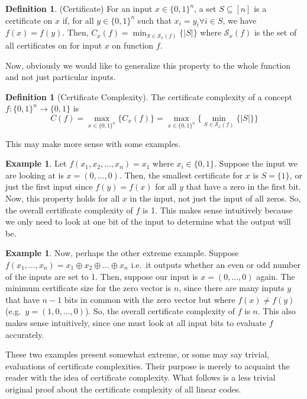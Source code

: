 \documentclass[12pt,twoside]{reedthesis}
\theoremstyle{definition}
\newtheorem{definition}[theorem]{Definition}
\newtheorem{example}[theorem]{Example}
\begin{document}
\begin{definition} (Certificate) For an input $x \in \{0,1\}^n$, a set $S \subseteq [n]$ is a certificate on $x$ if, for all $y \in \{0,1\}^n$ such that $x_i = y_i \forall i \in S$, we have $f(x) = f(y)$. Then, $C_x(f) = \min_{S\in\mathscr{S}_x(f)} \{\lvert S \rvert \}$ where $\mathscr{S}_x(f)$ is the set of all certificates on for input $x$ on function $f$.
\end{definition}
Now, obviously we would like to generalize this property to the whole function and not just particular inputs.
\begin{definition}[Certificate Complexity] The certificate complexity of a concept $f: \{0,1\}^n \rightarrow \{0,1\}$ is 
\begin{equation*}
C(f) = \max_{x\in \{0,1\}^n}\{C_x(f)\} = \max_{x\in \{0,1\}^n}\{\min_{S\in\mathscr{S}_x(f)} \{\lvert S \rvert \}\}
\end{equation*}
\end{definition}

This may make more sense with some examples.
\begin{example}
Let $f(x_1, x_2, \ldots, x_n) = x_1$ where $x_i \in \{0,1\}$. Suppose the input we are looking at is $x = (0, \ldots, 0)$. Then, the smallest certificate for $x$ is $S = \{1\}$, or just the first input since $f(y) = f(x)$ for all $y$ that have a zero in the first bit. Now, this property holds for all $x$ in the input, not just the input of all zeros. So, the overall certificate complexity of $f$ is 1. This makes sense intuitively because we only need to look at one bit of the input to determine what the output will be.
\end{example}
\begin{example}
Now, perhaps the other extreme example. Suppose $f(x_1, \ldots, x_n) = x_1 \oplus x_2 \oplus \ldots \oplus x_n$ i.e.~it outputs whether an even or odd number of the inputs are set to 1. Then, suppose our input is $x = (0, \ldots, 0)$ again. The minimum certificate size for the zero vector is $n$, since there are many inputs $y$ that have $n-1$ bits in common with the zero vector but where $f(x) \neq f(y)$ (e.g.~$y = (1, 0, \ldots, 0)$). So, the overall certificate complexity of $f$ is $n$. This also makes sense intuitively, since one must look at all input bits to evaluate $f$ accurately.
\end{example}
These two examples present somewhat extreme, or some may say trivial, evaluations of certificate complexities. Their purpose is merely to acquaint the reader with the idea of certificate complexity. What follows is a less trivial original proof about the certificate complexity of all linear codes.
\end{document}
